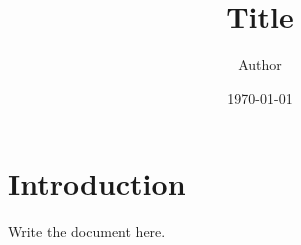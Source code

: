 \documentclass{article}
\title{Title}
\author{Author}
\date{\today}
\begin{document}
\maketitle

\section{Introduction}

Write the document here.
\end{document}
